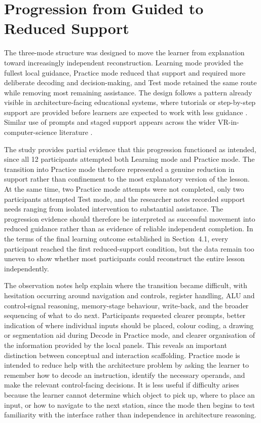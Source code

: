 \section{Progression from Guided to Reduced Support}

The three-mode structure was designed to move the learner from explanation toward increasingly independent reconstruction. Learning mode provided the fullest local guidance, Practice mode reduced that support and required more deliberate decoding and decision-making, and Test mode retained the same route while removing most remaining assistance. The design follows a pattern already visible in architecture-facing educational systems, where tutorials or step-by-step support are provided before learners are expected to work with less guidance \cite{tlili2016improving,tan2023vr}. Similar use of prompts and staged support appears across the wider VR-in-computer-science literature \cite{janani2026virtual}.

The study provides partial evidence that this progression functioned as intended, since all 12 participants attempted both Learning mode and Practice mode. The transition into Practice mode therefore represented a genuine reduction in support rather than confinement to the most explanatory version of the lesson. At the same time, two Practice mode attempts were not completed, only two participants attempted Test mode, and the researcher notes recorded support needs ranging from isolated intervention to substantial assistance. The progression evidence should therefore be interpreted as successful movement into reduced guidance rather than as evidence of reliable independent completion. In the terms of the final learning outcome established in Section~4.1, every participant reached the first reduced-support condition, but the data remain too uneven to show whether most participants could reconstruct the entire lesson independently.

The observation notes help explain where the transition became difficult, with hesitation occurring around navigation and controls, register handling, ALU and control-signal reasoning, memory-stage behaviour, write-back, and the broader sequencing of what to do next. Participants requested clearer prompts, better indication of where individual inputs should be placed, colour coding, a drawing or segmentation aid during Decode in Practice mode, and clearer organisation of the information provided by the local panels. This reveals an important distinction between conceptual and interaction scaffolding. Practice mode is intended to reduce help with the architecture problem by asking the learner to remember how to decode an instruction, identify the necessary operands, and make the relevant control-facing decisions. It is less useful if difficulty arises because the learner cannot determine which object to pick up, where to place an input, or how to navigate to the next station, since the mode then begins to test familiarity with the interface rather than independence in architecture reasoning.

